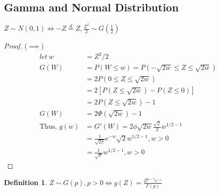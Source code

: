 \documentclass{article}
\theoremstyle{definition}
\newtheorem{definition}{Definition}[section]
\theoremstyle{thrm}
\theoremstyle{lma}
\theoremstyle{ppst}
\theoremstyle{crlr}
\begin{document}
\subsection{Gamma and Normal Distribution}
$Z\sim N(0,1) \iff -Z\stackrel{d}{=}Z, \frac{Z^2}{2}\sim G(\frac{1}{2})$
\begin{proof}
	($\implies$)
	\begin{align*}
		let \ w&=Z^2/2\\
		G(W)&=P(W\leq w) = P(-\sqrt{2w} \leq Z \leq \sqrt{2w})\\
		&=2P(0\leq Z \leq \sqrt{2w})\\
		&=2[P(Z\leq \sqrt{2w})-P(Z\leq 0)]\\
		&=2P(Z\leq \sqrt{2w})-1\\
		G(W)& = 2\Phi(\sqrt{2w})-1\\
		\text{Thus, } g(w) &= G'(W) = 2 \phi \sqrt{2w} \frac{\sqrt{2}}{2}w^{1/2-1}\\
		&=\frac{1}{\sqrt{2\pi}}e^{-w}\sqrt{2}w^{1/2-1}, w>0\\
		&=\frac{1}{\sqrt{\pi}}w^{1/2-1}, w>0
	\end{align*}
\end{proof}
\begin{definition}
	$Z\sim G(p), p>0 \iff g(Z) = \frac{Z^{p-1}e^{-z}}{\Gamma (p)}$
\end{definition}
\end{document}
